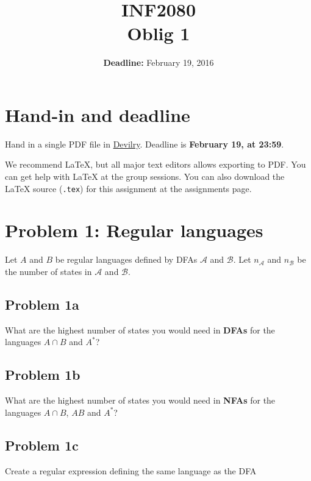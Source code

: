 \documentclass{article}
\title{INF2080\\Oblig 1}
\date{\textbf{Deadline:} February 19, 2016}
\begin{document}
\maketitle

\section{Hand-in and deadline}
Hand in a single PDF file in \href{https://devilry.ifi.uio.no/}{Devilry}. Deadline is \textbf{February 19, at 23:59}.

We recommend \LaTeX{}, but all major text editors allows exporting to PDF. You can get help with \LaTeX{} at the group sessions. You can also download the \LaTeX{} source (\texttt{.tex}) for this assignment at the assignments page.

\section{Problem 1: Regular languages}
Let $A$ and $B$ be regular languages defined by DFAs $\mathcal A$ and $\mathcal B$. Let $n_\mathcal A$ and $n_\mathcal B$ be the number of states in $\mathcal A$ and $\mathcal B$.

\subsection{Problem 1a}
What are the highest number of states you would need in \textbf{DFAs} for the languages $A\cap B$ and $A^*$?

\subsection{Problem 1b}
What are the highest number of states you would need in \textbf{NFAs} for the languages $A\cap B$, $AB$ and $A^*$?

\subsection{Problem 1c}
Create a regular expression defining the same language as the DFA

\begin{center}
\end{center}
\end{document}
